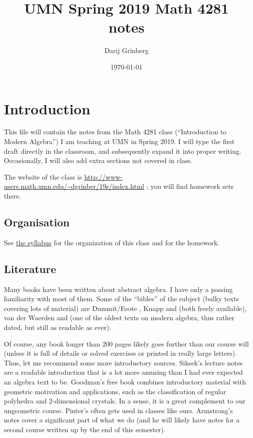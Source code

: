 \documentclass[numbers=enddot,12pt,final,onecolumn,notitlepage]{scrartcl}%
\newcounter{exer}
\numberwithin{exer}{subsection}
\theoremstyle{definition}
\begin{document}
\title{UMN Spring 2019 Math 4281 notes}
\author{Darij Grinberg}
\date{
\today
}
\maketitle
\tableofcontents

\section{Introduction}

This file will contain the notes from the Math 4281 class (``Introduction to
Modern Algebra'') I am teaching at UMN in Spring 2019. I will type the first
draft directly in the classroom, and subsequently expand it into proper
writing. Occasionally, I will also add extra sections not covered in class.

The website of the class is
\url{http://www-users.math.umn.edu/~dgrinber/19s/index.html} ; you will find
homework sets there.

\subsection{Organisation}

See \href{http://www-users.math.umn.edu/~dgrinber/19s/syll.pdf}{the syllabus}
for the organization of this class and for the homework.

\subsection{Literature}

Many books have been written about abstract algebra. I have only a passing
familiarity with most of them. Some of the ``bibles'' of the subject (bulky
texts covering lots of material) are Dummit/Foote \cite{Dummit-Foote}, Knapp
\cite{Knapp1} and \cite{Knapp2} (both freely available), van der Waerden
\cite{Waerden1} and \cite{Waerden2} (one of the oldest texts on modern
algebra, thus rather dated, but still as readable as ever).


Of course, any book longer than 200 pages likely goes further than our course
will (unless it is full of details or solved exercises or printed in really
large letters). Thus, let me recommend some more introductory sources.
Siksek's lecture notes \cite{Siksek} are a readable introduction that is a lot
more amusing than I had ever expected an algebra text to be. Goodman's free
book \cite{Goodman} combines introductory material with geometric motivation
and applications, such as the classification of regular polyhedra and
2-dimensional crystals. In a sense, it is a great complement to our
ungeometric course. Pinter's \cite{Pinter} often gets used in classes like
ours. Armstrong's notes \cite{Armstrong} cover a significant part of what we
do (and he will likely have notes for a second course written up by the end of
this semester).
\end{document}
